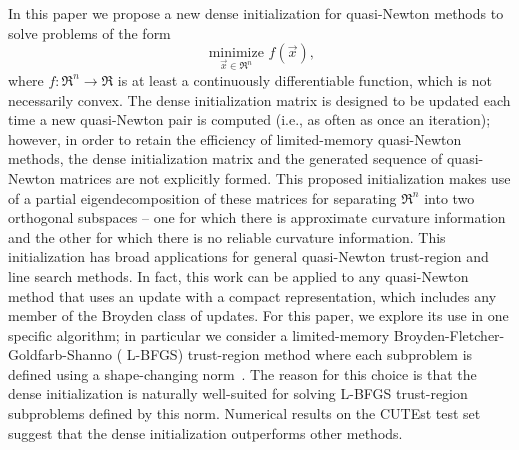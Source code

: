\label{sec-intro}
In this paper we propose a new
dense initialization for quasi-Newton methods 
to solve problems of the form
\begin{equation*}
	\underset{ \vec{x} \in \Re^n }{\text{ minimize }} f(\vec{x}),
\end{equation*}
where $ f:\Re^n\rightarrow\Re $ is %
at least a continuously differentiable function, which is not necessarily convex.
The dense
initialization matrix is designed to be updated each time a new
quasi-Newton pair is computed (i.e., as often as once an iteration);
however, in order to retain the efficiency of limited-memory
quasi-Newton methods, the dense initialization matrix and the
generated sequence of quasi-Newton matrices are not explicitly formed.
This proposed initialization makes use of a partial eigendecomposition 
of these matrices for separating  %
$\Re^n$ into two orthogonal subspaces -- one for which
there is approximate curvature information and the other for which
there is no reliable curvature information. 
This initialization has
broad applications for general quasi-Newton trust-region and line
search methods.  In fact, this work can be applied to any quasi-Newton
method that uses an update with a compact representation,
which includes any member of the Broyden class of updates. For this
paper, we explore its use in one specific algorithm; in particular
we consider a limited-memory Broyden-Fletcher-Goldfarb-Shanno ({\small
L-BFGS}) trust-region method where each subproblem is defined using a
shape-changing norm~\cite{BurdakovLMTR16}.  The reason for this choice
is that the dense initialization is naturally well-suited for solving
{\small L-BFGS} trust-region subproblems defined by this norm.
Numerical results on the {\small CUTE}st test set suggest that the dense initialization outperforms
other \LBFGS{} methods.

\medskip 

